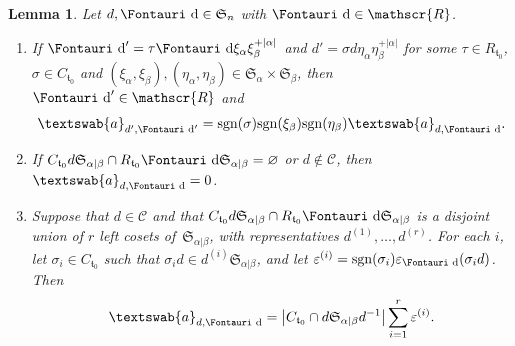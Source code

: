 \documentclass[pdftex]{sigma}
\newtheorem{Lemma}[Theorem]{Lemma}
\renewcommand{\t}{\mathfrak{t}}
\renewcommand{\a}{\textswab{a}}
\newcommand{\sgn}{\mathrm{sgn}}
\newcommand{\sym}[1]{\mathfrak{S}_{#1}}
\newcommand{\R}{\mathscr{R}}
\newcommand{\C}{\mathscr{C}}
\newcommand{\dR}{\text{\Fontauri d}}
\newcommand{\e}{\varepsilon}
\newcommand{\tlxi}[2]{\xi_{#1}^{+#2}}
\begin{document}
\begin{Lemma} \label{L:a}
Let $d,\dR \in \sym{n}$ with $\dR \in \R$.
\begin{enumerate}\itemsep=0pt
\item [$(i)$] If $\dR' = \tau \dR \xi_{\alpha}\tlxi{\beta}{|\alpha|}$ and $d' = \sigma d \eta_{\alpha}\eta_{\beta}^{+|\alpha|}$ for some $\tau\in R_{\t_0}$, $\sigma\in C_{\t_0}$ and $(\xi_\alpha,\xi_\beta),(\eta_\alpha,\eta_\beta) \in \sym{\alpha} \times \sym{\beta}$, then $\dR' \in \R$ and
 \begin{gather*}
 \a_{d',\dR'} = \sgn(\sigma)\sgn(\xi_\beta)\sgn(\eta_{\beta}) \a_{d,\dR}.
 \end{gather*}

\item [$(ii)$] If $C_{\t_0}d\sym{\alpha|\beta} \cap R_{\t_0} \dR \sym{\alpha|\beta} = \varnothing$ or $d \notin \C$, then $\a_{d,\dR} = 0$.
\item [$(iii)$] Suppose that $d \in \C$ and that $C_{\t_0}d\sym{\alpha|\beta} \cap R_{\t_0} \dR \sym{\alpha|\beta}$ is a disjoint union of $r$ left cosets of~$\sym{\alpha|\beta}$, with representatives $d^{(1)},\dotsc, d^{(r)}$. For each $i$, let $\sigma_i \in C_{\t_0}$ such that $\sigma_i d \in d^{(i)} \sym{\alpha|\beta}$, and let $\e^{(i)} = \sgn(\sigma_i) \e_{\dR}(\sigma_i d)$. Then
 \begin{gather*}
 \a_{d,\dR} = \big|C_{\t_0} \cap d \sym{\alpha|\beta} d^{-1}\big| \sum_{i=1}^r \e^{(i)}.
 \end{gather*}
\end{enumerate}
\end{Lemma}
\end{document}
